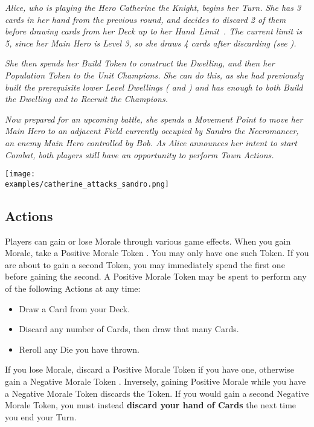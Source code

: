 \begin{multicols*}{2}
\textit{Alice, who is playing the Hero Catherine the Knight, begins her Turn.
She has 3 cards in her hand from the previous round, and decides to discard 2 of them before drawing cards from her Deck up to her \mbox{Hand Limit .}
The current limit is 5, since her Main Hero is Level 3, so she draws 4 cards after discarding (see ).}\par
\textit{She then spends her Build Token to construct the  Dwelling, and then her Population Token to  the  Unit Champions.
She can do this, as she had previously built the prerequisite lower Level Dwellings ( and ) and has enough  to both Build the Dwelling and to Recruit the Champions.}\par
\textit{Now prepared for an upcoming battle, she spends a Movement Point to move her Main Hero to an adjacent Field currently occupied by Sandro the Necromancer, an enemy Main Hero controlled by Bob.
As Alice announces her intent to start Combat, both players still have an opportunity to perform Town Actions.}\par

\texttt{[image: \\examples/catherine\_attacks\_sandro.png]}
\vspace*{\fill}
\columnbreak

\subsection*{ Actions}
Players can gain or lose Morale through various game effects.
When you gain Morale, take a Positive Morale Token .
You may only have one such Token.
If you are about to gain a second Token, you may immediately spend the first one before gaining the second.
A Positive Morale Token may be spent to perform any of the following Actions at any time:
\begin{itemize}
  \item Draw a Card from your Deck.
  \item Discard any number of Cards, then draw that many Cards.
  \item Reroll any Die you have thrown.
\end{itemize}
If you lose Morale, discard a Positive Morale Token  if you have one, otherwise gain a Negative Morale Token .
Inversely, gaining Positive Morale while you have a Negative Morale Token discards the Token.
If you would gain a second Negative Morale Token, you must instead \textbf{discard your hand of Cards} the next time you end your Turn.\par


\end{multicols*}
